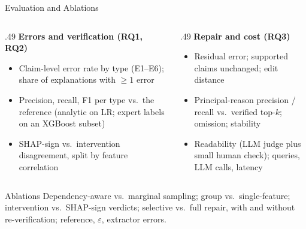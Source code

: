 \documentclass[aspectratio=169,10pt]{beamer}
\begin{document}
\begin{frame}{Evaluation and Ablations}
  \begin{columns}[T]
    \begin{column}{.49\textwidth}
      {\small\bfseries\color{vrblue}Errors and verification (RQ1, RQ2)}
      \begin{itemize}\footnotesize
        \setlength{\itemsep}{0.7ex}
        \item Claim-level error rate by type (E1--E6); share of explanations with $\ge 1$ error
        \item Precision, recall, F1 per type vs.\ the reference (analytic on LR; expert labels on an XGBoost subset)
        \item SHAP-sign vs.\ intervention disagreement, split by feature correlation
      \end{itemize}
    \end{column}
    \begin{column}{.49\textwidth}
      {\small\bfseries\color{vrblue}Repair and cost (RQ3)}
      \begin{itemize}\footnotesize
        \setlength{\itemsep}{0.7ex}
        \item Residual error; supported claims unchanged; edit distance
        \item Principal-reason precision / recall vs.\ verified top-$k$; omission; stability
        \item Readability (LLM judge plus small human check); queries, LLM calls, latency
      \end{itemize}
    \end{column}
  \end{columns}
  \vspace{1.5ex}
  \begin{block}{Ablations}
    Dependency-aware vs.\ marginal sampling; group vs.\ single-feature; intervention vs.\ SHAP-sign verdicts; selective vs.\ full repair, with and without re-verification; reference, $\varepsilon$, extractor errors.
  \end{block}
\end{frame}
\end{document}
